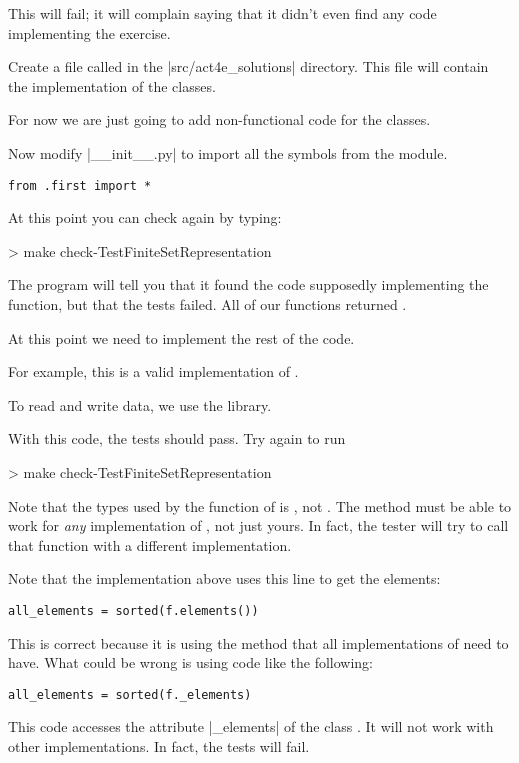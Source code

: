 This will fail; it will complain saying that it didn't even find any code implementing the exercise.


Create a file called  in the \files|src/act4e_solutions| directory.
This file will contain the implementation of the classes.

For now we are just going to add non-functional code for the classes.


Now modify \files|__init__.py| to import all the symbols from the  module.

\begin{verbatim}
from .first import *
\end{verbatim}

At this point you can check again by typing:

\begin{console}
> make check-TestFiniteSetRepresentation
\end{console}

The program will tell you that it found the code supposedly implementing the function,
but that the tests failed. All of our functions returned .

At this point we need to implement the rest of the code.

For example, this is a valid implementation of .



To read and write data, we use the  library.


With this code, the tests should pass. Try again to run

\begin{console}
> make check-TestFiniteSetRepresentation
\end{console}

Note that the types used by the function  of  is ,
not . The method must be able to work for \emph{any} implementation of  ,
not just yours. In fact, the tester will try to call that function with a different implementation.

Note that the implementation above uses this line to get the elements:
\begin{verbatim}
all_elements = sorted(f.elements())
\end{verbatim}
This is correct because it is using the method  that all implementations of  
need to have. What could be wrong is using code like the following:
\begin{verbatim}
all_elements = sorted(f._elements)
\end{verbatim}
This code accesses the attribute \pystr|_elements| of the class .
It will not work with other implementations. In fact, the tests will fail.


